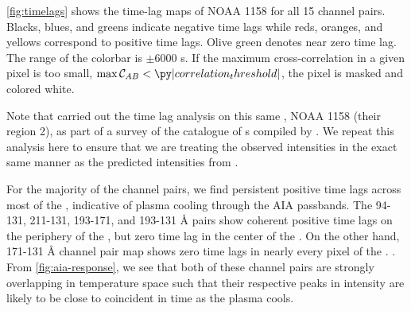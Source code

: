 \autoref{fig:timelags} shows the time-lag maps of \AR{} NOAA 1158 for all 15 channel pairs.
Blacks, blues, and greens indicate negative time lags while reds, oranges, and yellows correspond to positive time lags.
Olive green denotes near zero time lag.
The range of the colorbar is $\pm6000$ s.
If the maximum cross-correlation in a given pixel is too small, $\max\mathcal{C}_{AB}<\py|correlation_threshold|$, the pixel is masked and colored white.

Note that  carried out the time lag analysis on this same \AR{}, NOAA 1158 (their region 2), as part of a survey of the catalogue of \AR{}s compiled by \citet{warren_systematic_2012}.
We repeat this analysis here to ensure that we are treating the observed intensities in the exact same manner as the predicted intensities from .

For the majority of the channel pairs, we find persistent positive time lags across most of the \AR{}, indicative of plasma cooling through the AIA passbands.
The 94-131, 211-131, 193-171, and 193-131 \AA{} pairs show coherent positive time lags on the periphery of the \AR{}, but zero time lag in the center of the \AR{}.
On the other hand, 171-131 \AA{} channel pair map shows zero time lags in nearly every pixel of the \AR{}.
.
From \autoref{fig:aia-response}, we see that both of these channel pairs are strongly overlapping in temperature space such that their respective peaks in intensity are likely to be close to coincident in time as the plasma cools.

